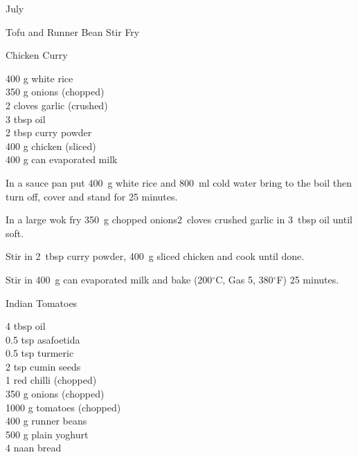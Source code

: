 \begin{menu}{July}
\begin{recipe}{2}{Tofu and Runner Bean Stir Fry}
\begin{instructions}
    \end{instructions}
    \end{recipe}%
  
    \begin{recipe}{2}{Chicken Curry}%
		\begin{ingredients}
		400 g white rice  \\
	350 g onions (chopped) \\
	2 cloves garlic (crushed) \\
	3 tbsp oil  \\
	2 tbsp curry powder  \\
	400 g chicken (sliced) \\
	400 g can evaporated milk  \\
	
		\end{ingredients}
	
	
    \begin{instructions}
    \item 
      In a
      sauce pan
      put
      400~g  white rice
      and
      800~ml  cold water
      bring to the boil then turn off, cover and stand for 25 minutes.
    \item 
        In a large wok fry
        350~g chopped onions2~cloves crushed garlic
        in
        3~tbsp  oil
        until soft.
      \item 
        Stir in
        2~tbsp  curry powder,
        400~g sliced chicken
        and cook until done.
      \item 
        Stir in
        400~g  can evaporated milk
        and
        bake (200$^{\circ}$C, Gas 5, 380$^{\circ}$F) 25 minutes.
      
    \end{instructions}
    \end{recipe}%
  
    \begin{recipe}{2}{Indian Tomatoes}%
		\begin{ingredients}
		4 tbsp oil  \\
	0.5 tsp asafoetida  \\
	0.5 tsp turmeric  \\
	2 tsp cumin seeds  \\
	1  red chilli (chopped) \\
	350 g onions (chopped) \\
	1000 g tomatoes (chopped) \\
	400 g runner beans  \\
	500 g plain yoghurt  \\
	4  naan bread  \\
	

\end{ingredients}
\end{recipe}
\end{menu}
